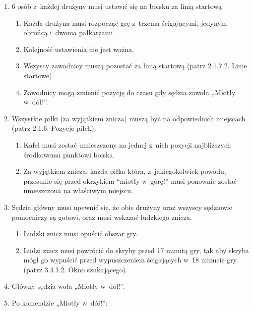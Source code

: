 \documentclass[12pt]{article}
\begin{document}
\begin{enumerate}
	\item
	      6 osób z~każdej drużyny musi ustawić się na boisku za linią startową

	      \begin{enumerate}
		      \item
		            Każda drużyna musi rozpocząć grę z~trzema ścigającymi, jedynym
		            obrońcą i~dwoma pałkarzami.
		      \item
		            Kolejność ustawienia nie jest ważna.
		      \item
		            Wszyscy zawodnicy muszą pozostać za linią startową (patrz 2.1.7.2.
		            Linie startowe).
		      \item
		            Zawodnicy mogą zmienić pozycję do czasu gdy sędzia zawoła „Miotły w~dół!''.
	      \end{enumerate}
	\item
	      Wszystkie piłki (za wyjątkiem znicza) muszą być na odpowiednich
	      miejscach (patrz 2.1.6. Pozycje piłek).

	      \begin{enumerate}
		      \item
		            Kafel musi zostać umieszczony na jednej z~nich pozycji najbliższych
		            środkowemu punktowi boiska.
		      \item
		            Za wyjątkiem znicza, każda piłka która, z~jakiegokolwiek powodu,
		            przesunie się przed okrzykiem ``miotły w~górę!'' musi ponownie
		            zostać umieszczona na właściwym miejscu.
	      \end{enumerate}
	\item
	      Sędzia główny musi upewnić się, że obie drużyny oraz wszyscy sędziowie
	      pomocniczy są gotowi, oraz musi wskazać ludzkiego znicza.

	      \begin{enumerate}
		      \item
		            Ludzki znicz musi opuścić obszar gry.
		      \item
		            Ludzi znicz musi powrócić do skryby przed 17 minutą gry, tak aby
		            skryba mógł go wypuścić przed wypuszczeniem ścigających w~18 minucie
		            gry (patrz 3.4.1.2. Okno szukającego).
	      \end{enumerate}
	\item
	      Główny sędzia woła „Miotły w~dół!''.
	\item
	      Po komendzie „Miotły w~dół!'':


\end{enumerate}
\end{document}
